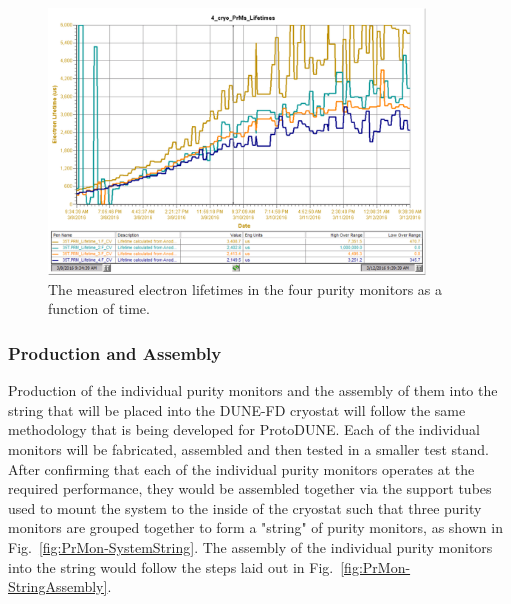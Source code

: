 \begin{figure}[t!]
\begin{center}
\includegraphics[width=10cm]{../figures/PrMon_35t-PrM.pdf}
\caption{The measured electron lifetimes in the four purity monitors as a function of time.} \label{fig-35t-prm}
\end{center}
\end{figure}



\subsubsection{Production and Assembly}
\label{sec:PrMon-Production-Assembly}
Production of the individual purity monitors and the assembly of them into the string that will be placed into the DUNE-FD cryostat will follow the same methodology that is being developed for ProtoDUNE.  Each of the individual monitors will be fabricated, assembled and then tested in a smaller test stand.  After confirming that each of the individual purity monitors operates at the required performance, they would be assembled together via the support tubes used to mount the system to the inside of the cryostat such that three purity monitors are grouped together to form a "string" of purity monitors, as shown in Fig.~\ref{fig:PrMon-SystemString}.  The assembly of the individual purity monitors into the string would follow the steps laid out in Fig.~\ref{fig:PrMon-StringAssembly}.  


